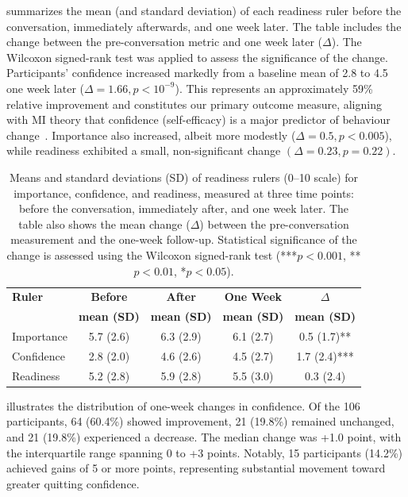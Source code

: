  summarizes the mean (and standard deviation) of each readiness ruler before the conversation, immediately afterwards, and one week later. The table includes the change between the pre-conversation metric and one week later ($\Delta$). The Wilcoxon signed-rank test was applied to assess the significance of the change. Participants' confidence increased markedly from a baseline mean of 2.8 to 4.5 one week later ($\Delta = 1.66, p < 10^{-9}$). This represents an approximately 59\% relative improvement and constitutes our primary outcome measure, aligning with MI theory that confidence (self-efficacy) is a major predictor of behaviour change~\citep{Gwaltney2009-wj,Abar2013}. Importance also increased, albeit more modestly ($\Delta = 0.5, p < 0.005$), while readiness exhibited a small, non-significant change $(\Delta = 0.23, p = 0.22)$.

\begin{table}[ht!]
	\centering
	\small
	\setlength{\tabcolsep}{4pt}
	\renewcommand{\arraystretch}{1.1}
	\begin{tabular}{@{}lcccc@{}}
		\toprule
		\textbf{Ruler} & \textbf{Before}    & \textbf{After}     & \textbf{One Week}  & \textbf{$\Delta$}  \\
		               & \textbf{mean (SD)} & \textbf{mean (SD)} & \textbf{mean (SD)} & \textbf{mean (SD)} \\
		\midrule
		Importance     & 5.7 (2.6)          & 6.3 (2.9)          & 6.1 (2.7)          & 0.5 (1.7)**        \\
		Confidence     & 2.8 (2.0)          & 4.6 (2.6)          & 4.5 (2.7)          & 1.7 (2.4)***       \\
		Readiness      & 5.2 (2.8)          & 5.9 (2.8)          & 5.5 (3.0)          & 0.3 (2.4)          \\
		\bottomrule
	\end{tabular}
	\caption[MIBot Readiness Ruler Summary]{Means and standard deviations (SD) of readiness rulers (0--10 scale) for importance, confidence, and readiness, measured at three time points: before the conversation, immediately after, and one week later. The table also shows the mean change ($\Delta$) between the pre-conversation measurement and the one-week follow-up. Statistical significance of the change is assessed using the Wilcoxon signed-rank test (***$p < 0.001$, **$p < 0.01$, *$p < 0.05$).}
	\label{table:mibot_ruler_summary}
\end{table}

 illustrates the distribution of one-week changes in confidence. Of the 106 participants, 64 (60.4\%) showed improvement, 21 (19.8\%) remained unchanged, and 21 (19.8\%) experienced a decrease. The median change was +1.0 point, with the interquartile range spanning 0 to +3 points. Notably, 15 participants (14.2\%) achieved gains of 5 or more points, representing substantial movement toward greater quitting confidence.

